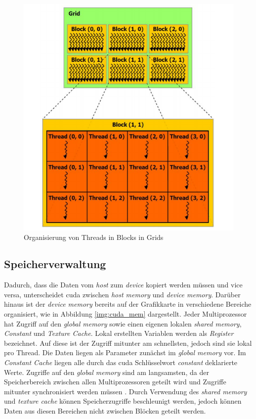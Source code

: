 \begin{figure}
	\centering
	\includegraphics[scale=0.55]{images/cuda1.png}
	\caption{Organisierung von Threads in Blocks in Grids \cite{cud2012}}
	\label{img:cuda1}
\end{figure}

\subsection{Speicherverwaltung}
\label{cudaMemory}

Dadurch, dass die Daten vom \textit{host} zum \textit{device} kopiert werden müssen und vice versa, unterscheidet cuda zwischen \textit{host memory} und \textit{device memory}. Darüber hinaus ist der \textit{device memory} bereits auf der Grafikkarte in verschiedene Bereiche organisiert, wie in Abbildung \ref{img:cuda_mem} dargestellt. Jeder Multiprozessor hat Zugriff auf den \textit{global memory} sowie einen eigenen lokalen \textit{shared memory}, \textit{Constant} und \textit{Texture Cache}. Lokal erstellten Variablen werden als \textit{Register} bezeichnet. Auf diese ist der Zugriff mitunter am schnellsten, jedoch sind sie lokal pro Thread. Die Daten liegen als Parameter zunächst im \textit{global memory} vor. Im \textit{Constant Cache} liegen alle durch das cuda Schlüsselwort \textit{\textunderscore\textunderscore constant\textunderscore\textunderscore} deklarierte Werte. Zugriffe auf den \textit{global memory} sind am langsamsten, da der Speicherbereich zwischen allen Multiprozessoren geteilt wird und Zugriffe mitunter synchronisiert werden müssen . Durch Verwendung des \textit{shared memory} und \textit{texture cache} können Speicherzugriffe beschleunigt werden, jedoch können Daten aus diesen Bereichen nicht zwischen Blöcken geteilt werden.

